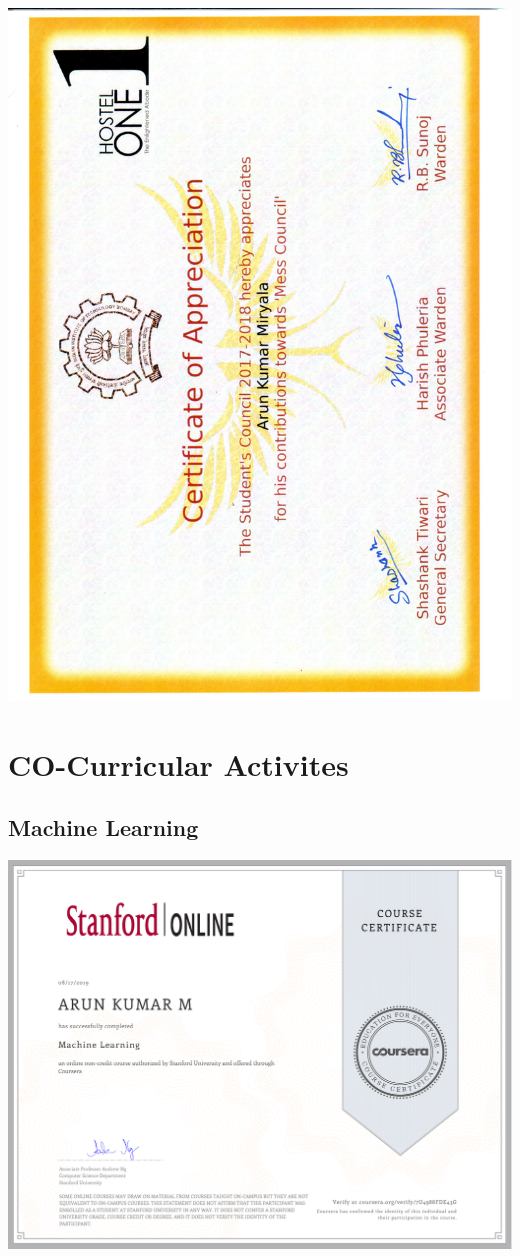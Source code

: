 \documentclass{article}
\begin{document}
	\includegraphics[page=1, scale=0.5]{proofs/mess_council.pdf}\\
\section{CO-Curricular Activites}
	\subsection{Machine Learning}
		\includegraphics[page=1, scale=0.5]{proofs/ML_certificate.pdf}\\
\end{document}
